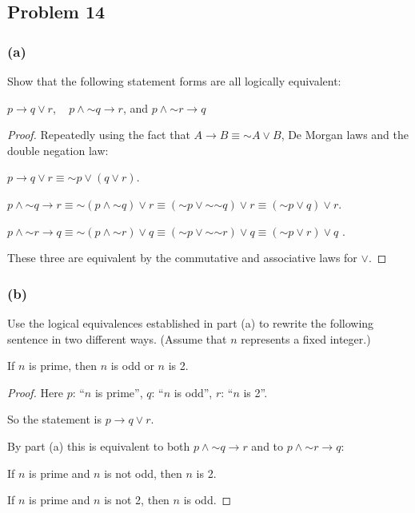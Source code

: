 \documentclass[14pt]{extarticle}
\begin{document}
\subsection{Problem 14}
\subsubsection{(a)}
Show that the following statement forms are all logically equivalent:

$p \to q \vee r$, \,\,\, $p \wedge {\sim q} \to r$, and $p \wedge {\sim r} \to
q$

\begin{proof}
Repeatedly using the fact that $A \to B \equiv {\sim A} \vee B$, De Morgan laws
and the double negation law:

$p \to q \vee r \equiv {\sim p} \vee (q \vee r)$.

$p \wedge {\sim q} \to r \equiv {\sim (p \wedge {\sim q}) \vee r} \equiv ({\sim
p} \vee {\sim {\sim q}}) \vee r \equiv ({\sim p} \vee q) \vee r$.

$p \wedge {\sim r} \to q \equiv {\sim (p \wedge {\sim r}) \vee q} \equiv ({\sim
p} \vee {\sim {\sim r}}) \vee q \equiv ({\sim p} \vee r) \vee q$ .

These three are equivalent by the commutative and associative laws for $\vee$.
\end{proof}

\subsubsection{(b)}
Use the logical equivalences established in part (a) to rewrite the following
sentence in two different ways. (Assume that $n$ represents a fixed integer.)

\begin{center}
If $n$ is prime, then $n$ is odd or $n$ is 2.
\end{center}

\begin{proof}
Here $p$: ``$n$ is prime'', $q$: ``$n$ is odd'', $r$: ``$n$ is 2''.

So the statement is $p \to q \vee r$.

By part (a) this is equivalent to both $p \wedge {\sim q} \to r$ and to $p
\wedge {\sim r} \to q$:

If $n$ is prime and $n$ is not odd, then $n$ is 2.

If $n$ is prime and $n$ is not 2, then $n$ is odd.
\end{proof}
\end{document}
